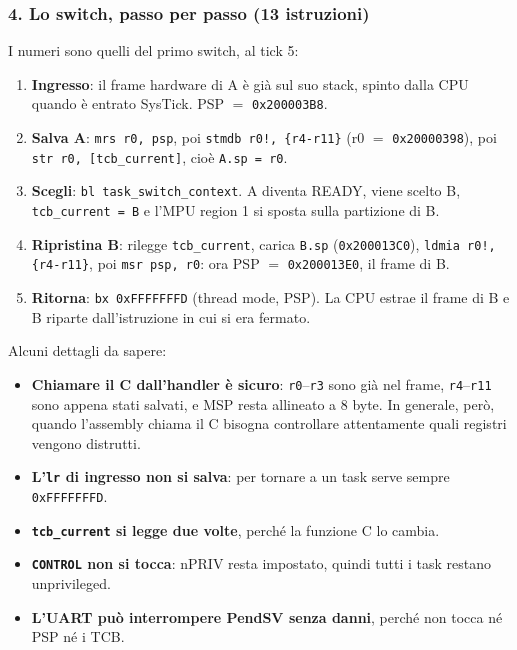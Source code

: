 \subsubsection*{4. Lo switch, passo per passo (13 istruzioni)}
I numeri sono quelli del primo switch, al tick 5:
\begin{enumerate}
    \item \textbf{Ingresso}: il frame hardware di A è già sul suo stack, spinto dalla CPU quando è entrato SysTick. PSP $=$ \texttt{0x200003B8}.
    \item \textbf{Salva A}: \texttt{mrs r0, psp}, poi \texttt{stmdb r0!, \{r4-r11\}} (r0 $=$ \texttt{0x20000398}), poi \texttt{str r0, [tcb\_current]}, cioè \texttt{A.sp = r0}.
    \item \textbf{Scegli}: \texttt{bl task\_switch\_context}. A diventa READY, viene scelto B, \texttt{tcb\_current = B} e l'MPU region 1 si sposta sulla partizione di B.
    \item \textbf{Ripristina B}: rilegge \texttt{tcb\_current}, carica \texttt{B.sp} (\texttt{0x200013C0}), \texttt{ldmia r0!, \{r4-r11\}}, poi \texttt{msr psp, r0}: ora PSP $=$ \texttt{0x200013E0}, il frame di B.
    \item \textbf{Ritorna}: \texttt{bx 0xFFFFFFFD} (thread mode, PSP). La CPU estrae il frame di B e B riparte dall'istruzione in cui si era fermato.
\end{enumerate}

Alcuni dettagli da sapere:
\begin{itemize}
    \item \textbf{Chiamare il C dall'handler è sicuro}: \texttt{r0}--\texttt{r3} sono già nel frame, \texttt{r4}--\texttt{r11} sono appena stati salvati, e MSP resta allineato a 8 byte. In generale, però, quando l'assembly chiama il C bisogna controllare attentamente quali registri vengono distrutti.
    \item \textbf{L'\texttt{lr} di ingresso non si salva}: per tornare a un task serve sempre \texttt{0xFFFFFFFD}.
    \item \textbf{\texttt{tcb\_current} si legge due volte}, perché la funzione C lo cambia.
    \item \textbf{\texttt{CONTROL} non si tocca}: nPRIV resta impostato, quindi tutti i task restano unprivileged.
    \item \textbf{L'UART può interrompere PendSV senza danni}, perché non tocca né PSP né i TCB.
\end{itemize}

